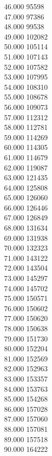 { 46.000	95598 \\
 47.000	97386 \\
 48.000	99538 \\
 49.000	102082 \\
 50.000	105114 \\
 51.000	107143 \\
 52.000	107582 \\
 53.000	107995 \\
 54.000	108310 \\
 55.000	108678 \\
 56.000	109073 \\
 57.000	112312 \\
 58.000	112781 \\
 59.000	114269 \\
 60.000	114305 \\
 61.000	114679 \\
 62.000	119087 \\
 63.000	121435 \\
 64.000	125808 \\
 65.000	126060 \\
 66.000	126446 \\
 67.000	126849 \\
 68.000	131634 \\
 69.000	131938 \\
 70.000	132323 \\
 71.000	143122 \\
 72.000	143504 \\
 73.000	145297 \\
 74.000	145702 \\
 75.000	150571 \\
 76.000	150602 \\
 77.000	150620 \\
 78.000	150638 \\
 79.000	151730 \\
 80.000	152204 \\
 81.000	152569 \\
 82.000	152963 \\
 83.000	153357 \\
 84.000	153763 \\
 85.000	154268 \\
 86.000	157028 \\
 87.000	157060 \\
 88.000	157081 \\
 89.000	157518 \\
 90.000	164222 \\
}
